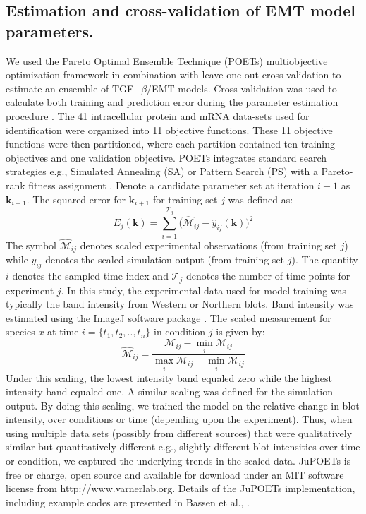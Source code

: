 \subsection*{Estimation and cross-validation of EMT model parameters.}
We used the Pareto Optimal Ensemble Technique (POETs) multiobjective optimization framework in combination with leave-one-out cross-validation to estimate an ensemble of TGF$-\beta$/EMT models.
Cross-validation was used to calculate both training and prediction error during the parameter estimation procedure \cite{kohavi1995study}.
The 41 intracellular protein and mRNA data-sets used for identification were organized into 11 objective functions.
These 11 objective functions were then partitioned, where each partition contained ten training objectives and one validation objective.
POETs integrates standard search strategies e.g., Simulated Annealing (SA) or Pattern Search (PS)
with a Pareto-rank fitness assignment \cite{Song:2010fk,JuPOETs-BioArXiv}.
Denote a candidate parameter set at iteration $i+1$ as $\mathbf{k}_{i+1}$.
The squared error for $\mathbf{k}_{i+1}$ for training set $j$ was defined as:
\begin{equation}\label{eqn_cost2}
	E_{j}(\mathbf{k}) = \sum_{i=1}^{\mathcal{T}_{j}}\biggl(\hat{\mathcal{M}}_{ij}-\hat{y}_{ij}(\mathbf{k})\biggr)^2
\end{equation}
The symbol $\hat{\mathcal{M}}_{ij}$ denotes scaled experimental observations (from training set $j$) while $\hat{y}_{ij}$ denotes the scaled simulation output (from training set $j$).
The quantity $i$ denotes the sampled time-index and $\mathcal{T}_{j}$ denotes the number of time points for experiment $j$.
In this study, the experimental data used for model training was typically the band intensity from Western or Northern blots.
Band intensity was estimated using the ImageJ software package \cite{IMAGEJ}.
The scaled measurement for species $x$ at time $i=\{t_{1},t_{2},..,t_{n}\}$ in condition $j$ is given by:
\begin{equation}\label{norm_exp_data}
\hat{\mathcal{M}}_{ij} = \frac{\mathcal{M}_{ij} - \min_{i}\mathcal{M}_{ij}}{\max_{i}{\mathcal{M}_{ij}}-\min_{i}{\mathcal{M}_{ij}}}
\end{equation}
Under this scaling, the lowest intensity band equaled zero while the highest intensity band equaled one.
A similar scaling was defined for the simulation output. By doing this scaling, we trained the model on the relative change in blot intensity, over conditions or time (depending upon the experiment). Thus, when using multiple data sets (possibly from different sources) that were qualitatively similar but quantitatively different e.g., slightly different blot intensities over time or condition, we captured the underlying trends in the scaled data.
JuPOETs is free or charge, open source and available for download under an MIT software license from http://www.varnerlab.org.
Details of the JuPOETs implementation, including example codes are presented in Bassen et al., \cite{JuPOETs-BioArXiv}.

